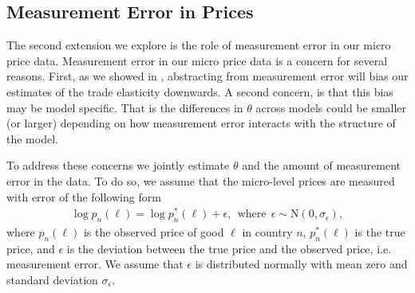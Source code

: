\documentclass[12pt,dvips, ps2pdf]{article}
\begin{document}
\subsection{Measurement Error in Prices}

The second extension we explore is the role of measurement error in our micro price data. Measurement error in our micro price data is a concern for several reasons. First, as we showed in \citet{sw_jie}, abstracting from measurement error will bias our estimates of the trade elasticity downwards. A second concern, is that this bias may be model specific. That is the differences in $\theta$ across models could be smaller (or larger) depending on how measurement error interacts with the structure of the model.

To address these concerns we jointly estimate $\theta$ and the amount of measurement error in the data. To do so, we assume that the micro-level prices are measured with error of the following form
\begin{align}
\log p_n(\ell) = \log p^*_n(\ell) + \epsilon, \ \ \mbox{where} \ \ \epsilon \sim \mbox{N}(0,\sigma_{\epsilon}),
\label{eq:m_error}
\end{align}
where $p_n(\ell)$ is the observed price of good $\ell$ in country $n$, $p^*_n(\ell)$ is the true price, and $\epsilon$ is the deviation between the true price and the observed price, i.e. measurement error. We assume that $\epsilon$ is distributed normally with mean zero and standard deviation $\sigma_{\epsilon}$.
\end{document}
